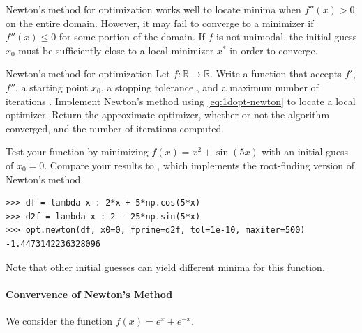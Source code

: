 Newton's method for optimization works well to locate minima when $f''(x) > 0$ on the entire domain.
However, it may fail to converge to a minimizer if $f''(x) \le 0$ for some portion of the domain.
If $f$ is not unimodal, the initial guess $x_0$ must be sufficiently close to a local minimizer $x^*$ in order to converge.

\begin{problem}{Newton's method for optimization}{}
Let $f:\mathbb{R}\rightarrow\mathbb{R}$.
Write a function that accepts $f'$, $f''$, a starting point $x_0$, a stopping tolerance , and a maximum number of iterations .
Implement Newton's method using \eqref{eq:1dopt-newton} to locate a local optimizer.
Return the approximate optimizer, whether or not the algorithm converged, and the number of iterations computed.

Test your function by minimizing $f(x) = x^2 + \sin(5x)$ with an initial guess of $x_0 = 0$.
Compare your results to , which implements the root-finding version of Newton's method.
\begin{lstlisting}
>>> df = lambda x : 2*x + 5*np.cos(5*x)
>>> d2f = lambda x : 2 - 25*np.sin(5*x)
>>> opt.newton(df, x0=0, fprime=d2f, tol=1e-10, maxiter=500)
-1.4473142236328096
\end{lstlisting}
Note that other initial guesses can yield different minima for this function.
\end{problem}


\paragraph{Convervence of Newton's Method}

We consider the function $f(x) = e^x + e^{-x}$.


